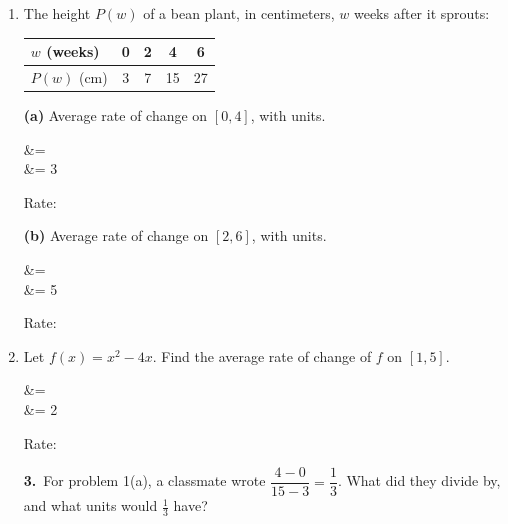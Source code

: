 \documentclass[10pt]{article}
\begin{document}
\begin{enumerate}[leftmargin=1.9em, itemsep=9pt]

\item The height $P(w)$ of a bean plant, in centimeters, $w$ weeks after it sprouts:
      \quad
      \renewcommand{\arraystretch}{1.2}%
      \begin{tabular}{|l|c|c|c|c|}
      \hline
      $w$ (weeks) & 0 & 2 & 4  & 6  \\ \hline
      $P(w)$ (cm) & 3 & 7 & 15 & 27 \\ \hline
      \end{tabular}

      \smallskip
      \begin{minipage}[t]{0.48\linewidth}
      \textbf{(a)} Average rate of change on $[0, 4]$, with units.

\begin{work}
   &=  \\
                            &= 3
\end{work}

      Rate: \blank{3.4cm}
      \end{minipage}\hfill
      \begin{minipage}[t]{0.48\linewidth}
      \textbf{(b)} Average rate of change on $[2, 6]$, with units.

\begin{work}
   &=  \\
                            &= 5
\end{work}

      Rate: \blank{3.4cm}
      \end{minipage}

\item \begin{minipage}[t]{0.44\linewidth}
      Let $f(x) = x^2 - 4x$. Find the average rate of change of $f$ on $[1, 5]$.

\begin{work}
   &=  \\
                            &= 2
\end{work}

      Rate: \blank{2.0cm}
      \end{minipage}\hfill
      \begin{minipage}[t]{0.50\linewidth}
      \textbf{3.}\ For problem 1(a), a classmate wrote $\dfrac{4 - 0}{15 - 3} = \dfrac{1}{3}$.
      What did they divide by, and what units would $\tfrac{1}{3}$ have?
      \writespace{1.4cm}{}
      \end{minipage}
\setcounter{enumi}{3}

\end{enumerate}
\end{document}
